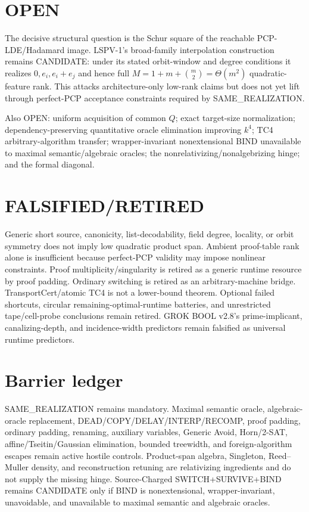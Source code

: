 \documentclass[11pt]{article}
\begin{document}
\section*{OPEN}
The decisive structural question is the Schur square of the reachable PCP-LDE/Hadamard image. LSPV-1's broad-family interpolation construction remains CANDIDATE: under its stated orbit-window and degree conditions it realizes $0,e_i,e_i+e_j$ and hence full $M=1+m+\binom m2=\Theta(m^2)$ quadratic-feature rank. This attacks architecture-only low-rank claims but does not yet lift through perfect-PCP acceptance constraints required by SAME\_REALIZATION.

Also OPEN: uniform acquisition of common $Q$; exact target-size normalization; dependency-preserving quantitative oracle elimination improving $k^4$; TC4 arbitrary-algorithm transfer; wrapper-invariant nonextensional BIND unavailable to maximal semantic/algebraic oracles; the nonrelativizing/nonalgebrizing hinge; and the formal diagonal.

\section*{FALSIFIED/RETIRED}
Generic short source, canonicity, list-decodability, field degree, locality, or orbit symmetry does not imply low quadratic product span. Ambient proof-table rank alone is insufficient because perfect-PCP validity may impose nonlinear constraints. Proof multiplicity/singularity is retired as a generic runtime resource by proof padding. Ordinary switching is retired as an arbitrary-machine bridge. TransportCert/atomic TC4 is not a lower-bound theorem. Optional failed shortcuts, circular remaining-optimal-runtime batteries, and unrestricted tape/cell-probe conclusions remain retired. GROK BOOL v2.8's prime-implicant, canalizing-depth, and incidence-width predictors remain falsified as universal runtime predictors.

\section*{Barrier ledger}
SAME\_REALIZATION remains mandatory. Maximal semantic oracle, algebraic-oracle replacement, DEAD/COPY/DELAY/INTERP/RECOMP, proof padding, ordinary padding, renaming, auxiliary variables, Generic Avoid, Horn/2-SAT, affine/Tseitin/Gaussian elimination, bounded treewidth, and foreign-algorithm escapes remain active hostile controls. Product-span algebra, Singleton, Reed--Muller density, and reconstruction retuning are relativizing ingredients and do not supply the missing hinge. Source-Charged SWITCH+SURVIVE+BIND remains CANDIDATE only if BIND is nonextensional, wrapper-invariant, unavoidable, and unavailable to maximal semantic and algebraic oracles.
\end{document}
